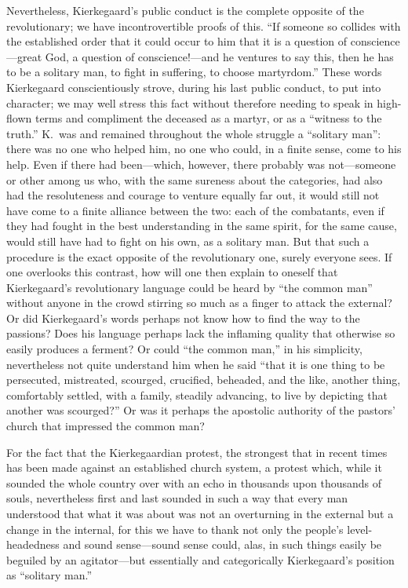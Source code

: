 \documentclass[12pt,a4paper]{article}
\newcommand{\opage}[1]{\marginnote{\footnotesize\textit{[#1]}}}
\begin{document}
Nevertheless, Kierkegaard's public conduct is the complete opposite of the
revolutionary; we have incontrovertible proofs
of this. ``If someone so collides with the
established order that it could occur to him that it is a
question of conscience---great God, a question
of conscience!---and he ventures to say this, then he has
to be a solitary man, to fight in suffering, to choose
martyrdom.'' These words Kierkegaard conscientiously strove,
during his last public conduct, to put into character;
we may well stress this fact without therefore
needing to speak in high-flown terms and compliment
the deceased as a martyr, or as a ``witness to the
truth.'' K.\ was and remained throughout the whole struggle a ``solitary
man'': there was no one who helped him, no one who could,
in a finite sense, come to his help. Even if there
had been---which, however, there probably was not---someone or other
among us who, with the same sureness about the categories,
had also had the resoluteness and courage to venture
equally far out, it would still not have come to a finite
alliance between the two: each of the combatants,
even if they had fought in the best understanding in the same
spirit, for the same cause, would still have had to fight on his own,
as a solitary man. But that such a procedure
is the exact opposite of the revolutionary one, surely
everyone sees. If one overlooks this contrast, how
will one then explain to oneself that Kierkegaard's revolutionary
language could be heard by ``the common man''
without anyone in the crowd stirring so much as a finger
to attack the external? Or did Kierkegaard's
words perhaps not know how to find the way to the passions?
Does his language perhaps lack the inflaming quality that
otherwise so easily produces a ferment? Or could ``the
\opage{29}common man,'' in his simplicity, nevertheless not
quite understand him when he said ``that it is one thing to be persecuted,
mistreated, scourged, crucified, beheaded, and the like,
another thing, comfortably settled, with a family, steadily
advancing, to live by depicting that another was
scourged?'' Or was it perhaps the apostolic authority of the pastors' church
that impressed the common man?

For the fact that the Kierkegaardian protest, the strongest that in
recent times has been made against an established church system, a
protest which, while it sounded the whole country over with an echo
in thousands upon thousands of souls, nevertheless first and last sounded
in such a way that every man understood that what it was about was not an
overturning in the external but a change in the internal,
for this we have to thank not only the people's
level-headedness and sound sense---sound sense
could, alas, in such things easily be beguiled by an agitator---but
essentially and categorically Kierkegaard's position as
``solitary man.''
\end{document}
